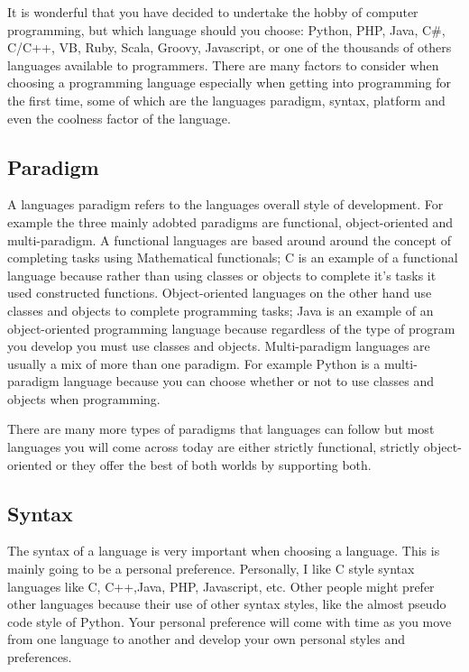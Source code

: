 It is wonderful that you have decided to undertake the hobby of computer programming, but which language should you choose: Python, PHP, Java, C\#,
C/C++, VB, Ruby, Scala, Groovy, Javascript, or one of the thousands of others languages available to programmers.
There are many factors to consider when choosing a programming language especially when getting into programming for the first time, some
of which are the languages paradigm, syntax, platform and even the coolness factor of the language.

\subsection{Paradigm}
A languages paradigm refers to the languages overall style of development.
For example the three mainly adobted paradigms are functional, object-oriented and multi-paradigm.
A functional languages are based around around the concept of completing tasks using Mathematical functionals; C is an example of
a functional language because rather than using classes or objects to complete it's tasks it used constructed functions.
Object-oriented languages on the other hand use classes and objects to complete programming tasks;
Java is an example of an object-oriented programming language because regardless of the type of program you develop you must use classes and objects.
Multi-paradigm languages are usually a mix of more than one paradigm.
For example Python is a multi-paradigm language because you can choose whether or not to use classes and objects when programming.
\par

There are many more types of paradigms that languages can follow but most languages you will come across today are either
strictly functional, strictly object-oriented or they offer the best of both worlds by supporting both.

\subsection{Syntax}
The syntax of a language is very important when choosing a language.
This is mainly going to be a personal preference.
Personally, I like C style syntax languages like C, C++,Java, PHP, Javascript, etc.
Other people might prefer other languages because their use of other syntax styles, like the almost pseudo code style of Python.
Your personal preference will come with time as you move from one language to another and develop your own personal styles and preferences.

